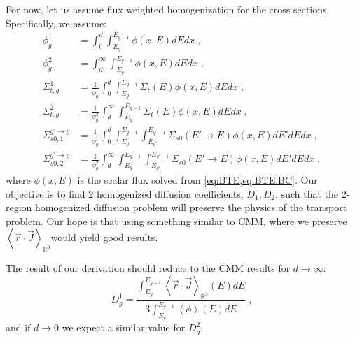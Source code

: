 \documentclass[a4paper,letterpaper,12pt,oneside,draft]{article}
\newcommand{\eec}{\;,}
\newcommand{\allspace}{\ensuremath{\mathbb{R}^3}}
\newcommand{\bracket}[1]{\ensuremath{\left\langle #1 \right\rangle}}
\newcommand{\bracketex}[2][V]{\ensuremath{\bracket{#2}_{#1}}}
\newcommand{\rdotJ}[1][\allspace]{\bracketex[#1]{\vec{r}\cdot\vec{J}}}
\newcommand{\intg}[2][g]{\ensuremath{\int_{E_{#1}}^{E_{#1-1}} #2 dE}}
\begin{document}
    For now, let us assume flux weighted homogenization for the cross sections. Specifically, we assume:
    \begin{align}
        \phi_{g}^1 &= \int_{0}^{d}\intg{\phi(x,E)}dx \eec\\
        \phi_{g}^2 &= \int_{d}^{\infty}\intg{\phi(x,E)}dx \eec\\
        \Sigma_{t,g}^1 &= \frac{1}{\phi_g^1}\int_{0}^{d}\intg{\Sigma_t(E)\phi(x,E)}dx \eec\\
        \Sigma_{t,g}^2 &= \frac{1}{\phi_g^2}\int_{d}^{\infty}\intg{\Sigma_t(E)\phi(x,E)}dx \eec\\
        \Sigma_{s0,1}^{g'\to g} &= \frac{1}{\phi_g^1} \int_{0}^{d}\intg{\intg[g']{\Sigma_{s0}(E'\to E)\phi(x,E)}'}dx \eec\\
        \Sigma_{s0,2}^{g'\to g} &= \frac{1}{\phi_g^2} \int_{d}^{\infty}\intg{\intg[g']{\Sigma_{s0}(E'\to E)\phi(x,E)}'}dx \eec
    \end{align}
    where $\phi(x,E)$ is the scalar flux solved from \cref{eq:BTE,eq:BTE:BC}.
    Our objective is to find 2 homogenized diffusion coefficients, $D_1,D_2$, such that the 2-region homogenized diffusion problem will preserve the physics of the transport problem.
    Our hope is that using something similar to CMM, where we preserve \rdotJ would yield good results. 
    
    The result of our derivation should reduce to the CMM results for $d\to\infty$:
    \begin{equation*}
        D^1_g = \frac{\intg{\rdotJ(E)}}{3\intg{\bracket{\phi}(E)}} \eec
    \end{equation*}
    and if $d\to0$ we expect a similar value for $D_g^2$.
    
\end{document}
